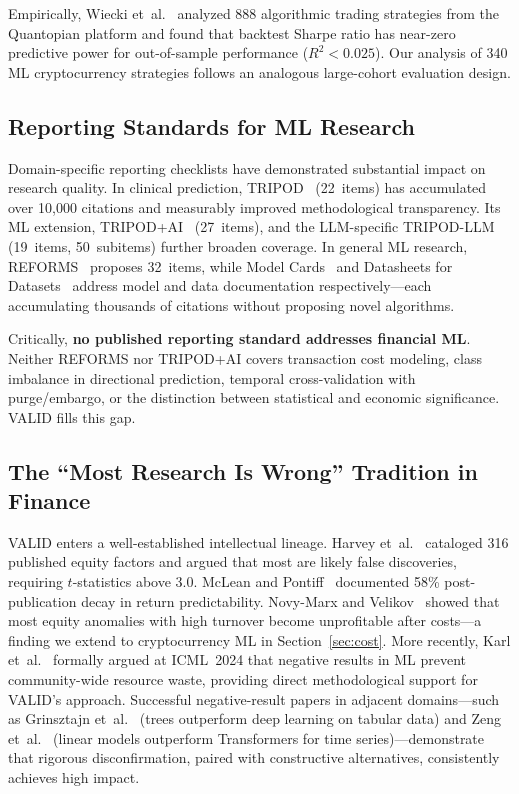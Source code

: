 \documentclass[sigconf,anonymous,review]{acmart}
\begin{document}
Empirically, Wiecki et~al.~\cite{wiecki2016glitters} analyzed 888
algorithmic trading strategies from the Quantopian platform and found
that backtest Sharpe ratio has near-zero predictive power for
out-of-sample performance ($R^2 < 0.025$). Our analysis of 340 ML
cryptocurrency strategies follows an analogous large-cohort evaluation
design.

\subsection{Reporting Standards for ML Research}

Domain-specific reporting checklists have demonstrated substantial
impact on research quality. In clinical prediction,
TRIPOD~\cite{collins2015tripod} (22~items) has accumulated over
10{,}000 citations and measurably improved methodological transparency.
Its ML extension, TRIPOD+AI~\cite{collins2024tripodai} (27~items),
and the LLM-specific TRIPOD-LLM~\cite{gallifant2025tripodllm}
(19~items, 50~subitems) further broaden coverage. In general ML
research, REFORMS~\cite{kapoor2024reforms} proposes 32~items, while
Model Cards~\cite{mitchell2019model} and Datasheets for
Datasets~\cite{gebru2021datasheets} address model and data
documentation respectively---each accumulating thousands of citations
without proposing novel algorithms.

Critically, \textbf{no published reporting standard addresses
financial ML}. Neither REFORMS nor TRIPOD+AI covers transaction cost
modeling, class imbalance in directional prediction, temporal
cross-validation with purge/embargo, or the distinction between
statistical and economic significance. VALID fills this gap.

\subsection{The ``Most Research Is Wrong'' Tradition in Finance}

VALID enters a well-established intellectual lineage.
Harvey et~al.~\cite{harvey2016cross} cataloged 316 published equity
factors and argued that most are likely false discoveries, requiring
$t$-statistics above 3.0. McLean and
Pontiff~\cite{mclean2016academic} documented 58\% post-publication
decay in return predictability. Novy-Marx and
Velikov~\cite{novymarx2016taxonomy} showed that most equity anomalies
with high turnover become unprofitable after costs---a finding we
extend to cryptocurrency ML in Section~\ref{sec:cost}.
More recently, Karl et~al.~\cite{karl2024embracing} formally argued
at ICML~2024 that negative results in ML prevent community-wide
resource waste, providing direct methodological support for VALID's
approach. Successful negative-result papers in adjacent domains---such
as Grinsztajn et~al.~\cite{grinsztajn2022tree} (trees outperform
deep learning on tabular data) and Zeng
et~al.~\cite{zeng2023transformers} (linear models outperform
Transformers for time series)---demonstrate that rigorous
disconfirmation, paired with constructive alternatives, consistently
achieves high impact.
\end{document}
